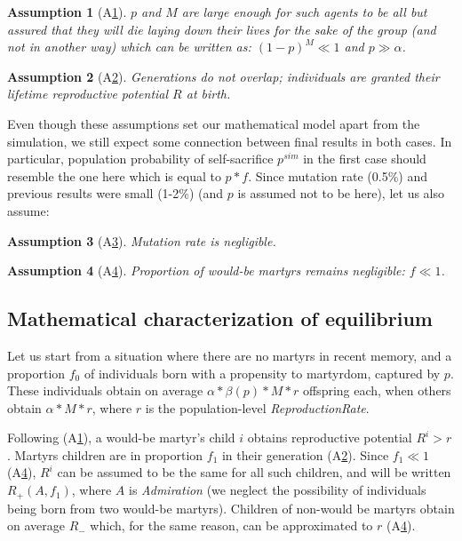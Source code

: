 \documentclass[a4paper,12pt]{report}
\newtheorem{ass}{Assumption}[section]
\begin{document}
\begin{ass}[A\ref{ass:p_large}] \label{ass:p_large}
    $p$ and $M$ are large enough for such agents to be all but assured that they will die laying down
    their lives for the sake of the group (and not in another way) which can be written as:
    $(1-p)^M \ll 1$ and $p \gg \alpha$.
    \end{ass}

\begin{ass}[A\ref{ass:gene}] \label{ass:gene}
    Generations do not overlap; individuals are granted their lifetime reproductive potential $R$
    at birth.
    \end{ass}
    
Even though these assumptions set our mathematical model apart from the simulation, we still
expect some connection between final results in both cases. In particular, population probability of 
self-sacrifice $p^{sim}$ in the first case should resemble the one here which is equal to
$p*f$. Since mutation rate (0.5\%) and previous results were small (1-2\%) (and $p$ is assumed not to be here),
let us also assume:

\begin{ass}[A\ref{ass:mut}] \label{ass:mut}
    Mutation rate is negligible.
    \end{ass}

\begin{ass}[A\ref{ass:f_small}] \label{ass:f_small}
    Proportion of would-be martyrs remains negligible: $f \ll 1$.
    \end{ass}


\subsection{Mathematical characterization of equilibrium}

Let us start from a situation where there are no martyrs in recent memory, and a
proportion $f_0$ of individuals born with a propensity to martyrdom, captured by $p$.
These individuals obtain on average 
$\alpha*\beta(p)*M*r$ offspring each,
when others obtain $\alpha*M*r$, where $r$ is the population-level \emph{ReproductionRate}. 

Following (A\ref{ass:p_large}), a would-be martyr's child $i$ obtains
reproductive potential $R^i>r$.
Martyrs children are in proportion $f_1$ in their generation (A\ref{ass:gene}).
Since $f_{1} \ll 1$ (A\ref{ass:f_small}), $R^i$ can be assumed to be the same
for all such children, and will be written
$R_+(A,f_1)$, where $A$ is \emph{Admiration} (we neglect the possibility of 
individuals being born from two would-be martyrs).
Children of non-would be martyrs obtain on average
$R_-$ which, for the same reason, can be approximated to $r$ (A\ref{ass:f_small}).
\end{document}
